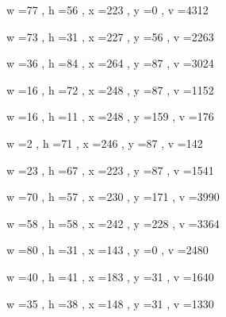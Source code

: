 \documentclass[11pt]{article}
\begin{document}
w =77 , h =56 , x =223 , y =0 , v =4312
\par
w =73 , h =31 , x =227 , y =56 , v =2263
\par
w =36 , h =84 , x =264 , y =87 , v =3024
\par
w =16 , h =72 , x =248 , y =87 , v =1152
\par
w =16 , h =11 , x =248 , y =159 , v =176
\par
w =2 , h =71 , x =246 , y =87 , v =142
\par
w =23 , h =67 , x =223 , y =87 , v =1541
\par
w =70 , h =57 , x =230 , y =171 , v =3990
\par
w =58 , h =58 , x =242 , y =228 , v =3364
\par
w =80 , h =31 , x =143 , y =0 , v =2480
\par
w =40 , h =41 , x =183 , y =31 , v =1640
\par
w =35 , h =38 , x =148 , y =31 , v =1330
\par
\newpage
\end{document}
